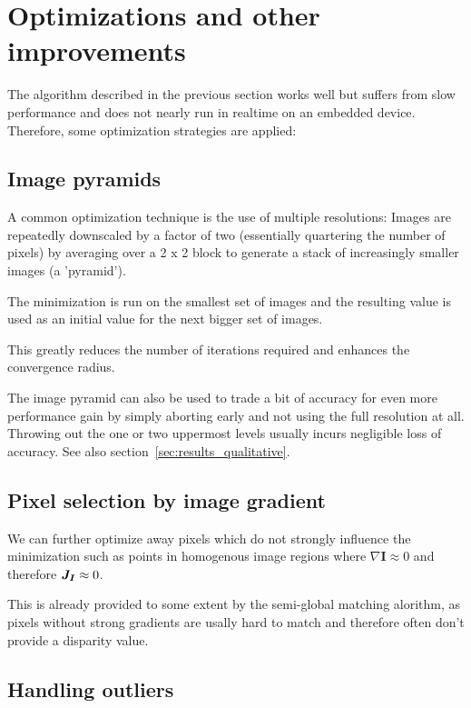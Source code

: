 \chapter{Optimizations and other improvements}
\label{sec:optimizations}

The algorithm described in the previous section works well but suffers from
slow performance and does not nearly run in realtime on an embedded device.
Therefore, some optimization strategies are applied:

\section{Image pyramids}
\label{sec:pyramids}

A common optimization technique is the use of multiple resolutions: Images are
repeatedly downscaled by a factor of two (essentially quartering the number of
pixels) by averaging over a 2 x 2 block to generate a stack of increasingly
smaller images (a 'pyramid').

The minimization is run on the smallest set of images and the resulting value
is used as an initial value for the next bigger set of images.

This greatly reduces the number of iterations required and enhances the
convergence radius.

The image pyramid can also be used to trade a bit of accuracy for even more
performance gain by simply aborting early and not using the full resolution at
all. Throwing out the one or two uppermost levels usually incurs negligible
loss of accuracy. See also section~\ref{sec:results_qualitative}.


\section{Pixel selection by image gradient}
\label{sec:gradient_filtering}

We can further optimize away pixels which do not strongly influence the
minimization such as points in homogenous image regions where $\nabla
\mathbf{I} \approx 0$ and therefore $\mat{J_I} \approx 0$.

This is already provided to some extent by the semi-global matching alorithm,
as pixels without strong gradients are usally hard to match and therefore often
don't provide a disparity value.

\section{Handling outliers}

